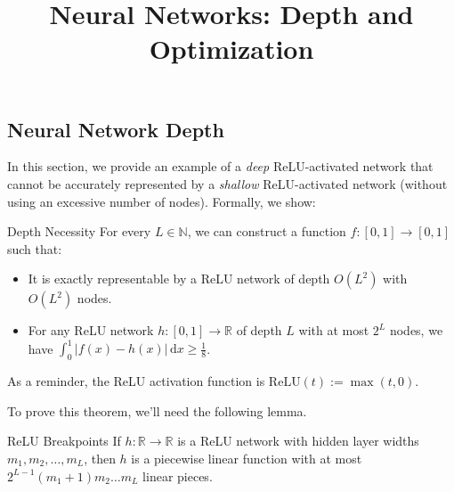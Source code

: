 \title{Neural Networks: Depth and Optimization}



\subsection{Neural Network Depth}

In this section,
we provide an example of a \emph{deep} ReLU-activated network
that cannot be accurately represented
by a \emph{shallow} ReLU-activated network
(without using an excessive number of nodes).
Formally, we show:

\begin{theorem}{Depth Necessity}
    For every $L \in \mathbb{N}$,
    we can construct a function $f \colon [0, 1] \to [0, 1]$
    such that:
    \begin{itemize}
        \item It is exactly representable
        by a ReLU network of depth $O(L^2)$
        with $O(L^2)$ nodes.
        \item For any ReLU network $h \colon [0, 1] \to \mathbb{R}$
        of depth $L$ with at most $2^L$ nodes,
        we have $\int_{0}^1 |f(x) - h(x)| \, \mathrm{d}x \geq \frac{1}{8}$.
    \end{itemize}
\end{theorem}

\begin{remark}
    As a reminder, the ReLU activation function
    is $\mathrm{ReLU}(t) := \max(t, 0)$.
\end{remark}

To prove this theorem,
we'll need the following lemma.

\begin{theorem}{ReLU Breakpoints}
    If $h \colon \mathbb{R} \to \mathbb{R}$
    is a ReLU network with hidden layer widths
    $m_1, m_2, \dots, m_L$, then
    $h$ is a piecewise linear function
    with at most $2^{L - 1} (m_1 + 1)m_2 \dots m_L$
    linear pieces.
\end{theorem}

